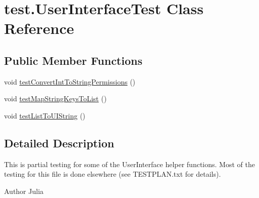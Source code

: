 \hypertarget{classtest_1_1_user_interface_test}{
\section{test.\-User\-Interface\-Test \-Class \-Reference}
\label{classtest_1_1_user_interface_test}
}
\subsection*{\-Public \-Member \-Functions}
\begin{DoxyCompactItemize}
\item 
void \hyperlink{classtest_1_1_user_interface_test_a210fc65683b780cfd3aa9325a5cca0b7}{test\-Convert\-Int\-To\-String\-Permissions} ()
\item 
void \hyperlink{classtest_1_1_user_interface_test_ae3de13813ec1942d05420624af3de7e0}{test\-Map\-String\-Keys\-To\-List} ()
\item 
void \hyperlink{classtest_1_1_user_interface_test_a3fc6149ddaec47af361614051c962d21}{test\-List\-To\-U\-I\-String} ()
\end{DoxyCompactItemize}


\subsection{\-Detailed \-Description}
\-This is partial testing for some of the \-User\-Interface helper functions. \-Most of the testing for this file is done elsewhere (see \-T\-E\-S\-T\-P\-L\-A\-N.\-txt for details). \begin{DoxyAuthor}{\-Author}
\-Julia 
\end{DoxyAuthor}



